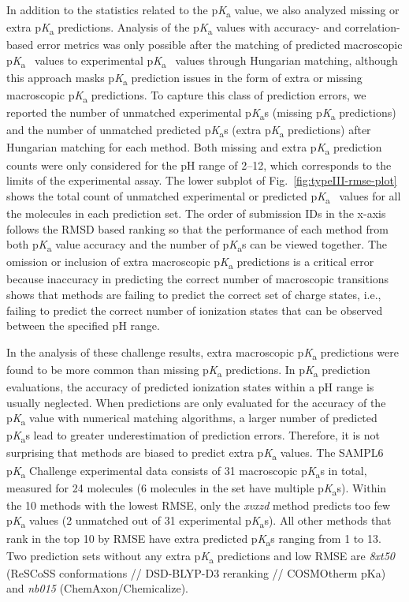 \documentclass[9pt,lineno,final]{elife}
\newcommand{\pKa}{p\textit{K}\textsubscript{a}}
\begin{document}
In addition to the statistics related to the \pKa{} value, we also analyzed missing or extra \pKa{} predictions. 
Analysis of the \pKa{} values with accuracy- and correlation-based error metrics was only possible after the matching of predicted macroscopic \pKa{}~ values to experimental \pKa{}~ values through Hungarian matching, although this approach masks \pKa{} prediction issues in the form of extra or missing macroscopic \pKa{} predictions. 
To capture this class of prediction errors, we reported the number of unmatched experimental \pKa{}s (missing \pKa{} predictions) and the number of unmatched predicted \pKa{}s (extra \pKa{} predictions) after Hungarian matching for each method. 
Both missing and extra \pKa{} prediction counts were only considered for the pH range of 2--12, which corresponds to the limits of the experimental assay.
The lower subplot of Fig.~\ref{fig:typeIII-rmse-plot} shows the total count of unmatched experimental or predicted \pKa{}~ values for all the molecules in each prediction set. 
The order of submission IDs in the x-axis follows the RMSD based ranking so that the performance of each method from both \pKa{} value accuracy and the number of \pKa{}s can be viewed together.
The omission or inclusion of extra macroscopic \pKa{} predictions is a critical error because inaccuracy in predicting the correct number of macroscopic transitions shows that methods are failing to predict the correct set of charge states, i.e., failing to predict the correct number of ionization states that can be observed between the specified pH range. 

In the analysis of these challenge results, extra macroscopic \pKa{} predictions were found to be more common than missing \pKa{} predictions. 
In \pKa{} prediction evaluations, the accuracy of predicted ionization states within a pH range is usually neglected. 
When predictions are only evaluated for the accuracy of the \pKa{} value with numerical matching algorithms, a larger number of predicted \pKa{}s lead to greater underestimation of prediction errors. 
Therefore, it is not surprising that methods are biased to predict extra \pKa{} values. 
The SAMPL6 \pKa{} Challenge experimental data consists of 31 macroscopic \pKa{}s in total, measured for 24 molecules (6 molecules in the set have multiple \pKa{}s).
Within the 10 methods with the lowest RMSE, only the \textit{xvxzd} method predicts too few \pKa{} values (2 unmatched out of 31 experimental \pKa{}s). 
All other methods that rank in the top 10 by RMSE have extra predicted \pKa{}s ranging from 1 to 13. 
Two prediction sets without any extra \pKa{} predictions and low RMSE are \textit{8xt50} (ReSCoSS conformations // DSD-BLYP-D3 reranking // COSMOtherm pKa) and \textit{nb015} (ChemAxon/Chemicalize).
\end{document}
